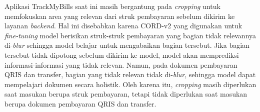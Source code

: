 Aplikasi TrackMyBills saat ini masih bergantung pada \emph{cropping} untuk memfokuskan area yang relevan dari struk pembayaran sebelum dikirim ke layanan \emph{backend}. Hal ini disebabkan karena \dataset{} CORD-v2 yang digunakan untuk \emph{fine-tuning} model \donut{} berisikan struk-struk pembayaran yang bagian tidak relevannya di-\emph{blur} sehingga model belajar untuk mengabaikan bagian tersebut. Jika bagian tersebut tidak dipotong sebelum dikirim ke model, model akan memprediksi informasi-informasi yang tidak relevan. Namun, pada dokumen pembayaran QRIS dan transfer, bagian yang tidak relevan tidak di-\emph{blur}, sehingga model \donut{} dapat mempelajari dokumen secara holistik. Oleh karena itu, \emph{cropping} masih diperlukan saat masukan berupa struk pembayaran, tetapi tidak diperlukan saat masukan berupa dokumen pembayaran QRIS dan transfer.